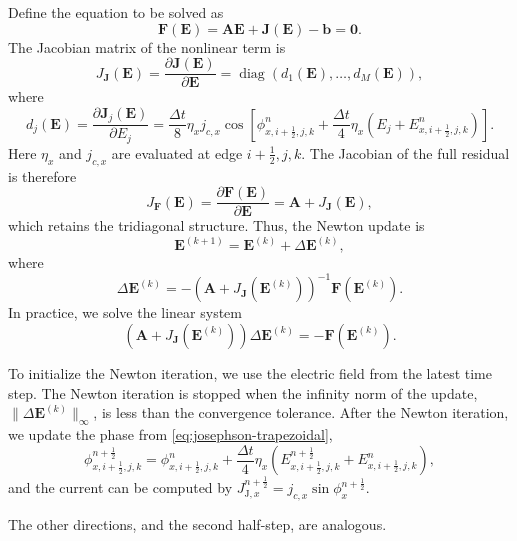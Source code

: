 \documentclass{article}
\numberwithin{equation}{section}
\numberwithin{figure}{section}
\begin{document}
Define the equation to be solved as
\begin{equation}\label{eq:josephson-residual}
    \mathbf{F}(\mathbf{E})=\mathbf{A}\mathbf{E}+\mathbf{J}(\mathbf{E})-\mathbf{b}=\mathbf{0}.
\end{equation}
The Jacobian matrix of the nonlinear term is
\begin{equation}\label{eq:josephson-current-jacobian}
    J_{\mathbf{J}}(\mathbf{E}) = \frac{\partial \mathbf{J}(\mathbf{E})}{\partial \mathbf{E}} = \operatorname{diag}\!\left(d_1(\mathbf{E}),\ldots,d_M(\mathbf{E})\right),
\end{equation}
where
\begin{equation}\label{eq:josephson-current-jacobian-diagonal}
    d_j(\mathbf{E})= \frac{\partial \mathbf{J}_j(\mathbf{E})}{\partial E_j} = \frac{\Delta t}{8}\eta_x j_{c,x}\cos\!\left[\phi_{x,i+\tfrac12,j,k}^{n}+\frac{\Delta t}{4}\eta_x\left(E_j+E_{x,i+\tfrac12,j,k}^{n}\right)\right].
\end{equation}
Here \(\eta_x\) and \(j_{c,x}\) are evaluated at edge \(i+\tfrac12,j,k\). The Jacobian of the full residual is therefore
\begin{equation}\label{eq:josephson-residual-jacobian}
    J_{\mathbf{F}}(\mathbf{E})=\frac{\partial\mathbf{F}(\mathbf{E})}{\partial\mathbf{E}}=\mathbf{A}+J_{\mathbf{J}}(\mathbf{E}),
\end{equation}
which retains the tridiagonal structure. Thus, the Newton update is
\begin{equation}
    \mathbf{E}^{(k+1)} = \mathbf{E}^{(k)} + \Delta\mathbf{E}^{(k)},
\end{equation}
where
\begin{equation}
    \Delta\mathbf{E}^{(k)} = -\left(\mathbf{A}+J_{\mathbf{J}}(\mathbf{E}^{(k)})\right)^{-1}\mathbf{F}(\mathbf{E}^{(k)}).
\end{equation}
In practice, we solve the linear system
\begin{equation}
    \left(\mathbf{A}+J_{\mathbf{J}}(\mathbf{E}^{(k)})\right)\Delta\mathbf{E}^{(k)} = -\mathbf{F}(\mathbf{E}^{(k)}).
\end{equation}

To initialize the Newton iteration, we use the electric field from the latest time step. The Newton iteration is stopped when the infinity norm of the update, $\|\Delta\mathbf{E}^{(k)}\|_{\infty}$, is less than the convergence tolerance. 
After the Newton iteration, we update the phase from \eqref{eq:josephson-trapezoidal},
\begin{equation}\label{eq:josephson-phi-j-newton}
    \phi_{x,i+\tfrac12,j,k}^{n+\frac12}=\phi_{x,i+\tfrac12,j,k}^{n}+\frac{\Delta t}{4}\eta_x\left(E_{x,i+\tfrac12,j,k}^{n+\frac12}+E_{x,i+\tfrac12,j,k}^{n}\right),
\end{equation}
and the current can be computed by $J_{\mathrm{J},x}^{n+\frac12}=j_{c,x}\sin\phi_x^{n+\frac12}$.

The other directions, and the second half-step, are analogous.
\end{document}

